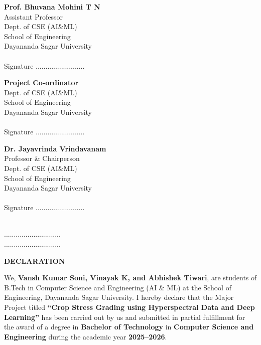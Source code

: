 \documentclass[ 12pt,a4paper,twocolumn,fleqn]{report}
\begin{document}
\vspace{20mm}
\noindent
\begin{minipage}[t]{0.31\textwidth}
\small
  \textbf{Prof. Bhuvana Mohini T N}\\
  Assistant Professor\\
  Dept. of CSE (AI\&ML)\\
  School of Engineering\\
  Dayananda Sagar University\\
  \\
  Signature .........................\\
\end{minipage}%
\hfill
\begin{minipage}[t]{0.31\textwidth}
\small
  \textbf{Project Co-ordinator}\\
  Dept. of CSE (AI\&ML)\\
  School of Engineering\\
  Dayananda Sagar University\\
  \\
  Signature .........................\\
\end{minipage}%
\hfill
\begin{minipage}[t]{0.34\textwidth}
\small
  \textbf{Dr. Jayavrinda Vrindavanam}\\
  Professor \& Chairperson\\
  Dept. of CSE (AI\&ML)\\
  School of Engineering\\
  Dayananda Sagar University \\
  \\
  Signature .........................\\
\end{minipage}

\vspace{10mm}
\hfill
\vspace{5mm}
 \\
\vspace{5mm}
\hfill{.............................} \\
\vspace{5mm}
\hfill{.............................} \\


\newpage
  \pagestyle{plain}

  \begin{center}
    \huge\textbf{DECLARATION}
\end{center}
\vspace{15mm}
We, \textbf{Vansh Kumar Soni, Vinayak K, and Abhishek Tiwari}, are students of B.Tech in Computer Science and Engineering (AI \& ML) at the School of Engineering, Dayananda Sagar University. I hereby declare that the Major Project titled \textbf{“Crop Stress Grading using Hyperspectral Data and Deep Learning”} has been carried out by us and submitted in partial fulfillment for the award of a degree in \textbf{Bachelor of Technology} in \textbf{Computer Science and Engineering} during the academic year \textbf{2025--2026}.
\vspace{15 mm}
\end{document}

